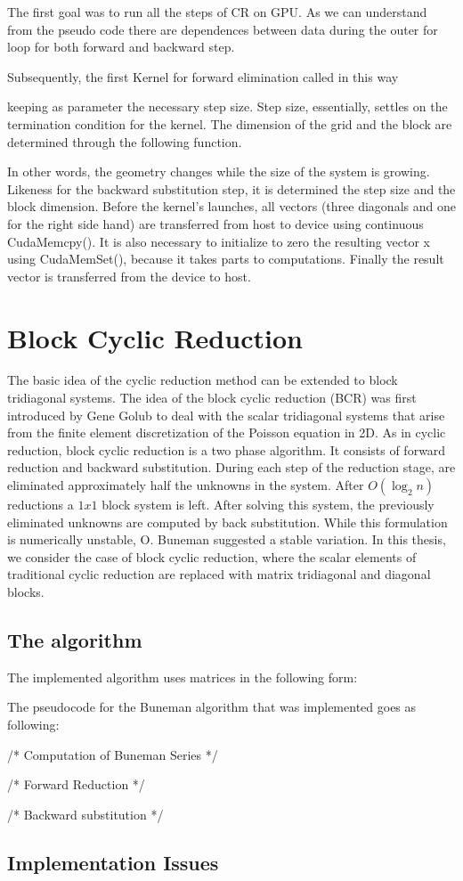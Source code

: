 The first goal was to run all the steps of CR on GPU. As we can understand from the pseudo code there are dependences between data during the outer for loop for both forward and backward step. 

Subsequently, the first Kernel for forward elimination called in this way


keeping as parameter the necessary step size. Step size, essentially, settles on the termination condition for the kernel. The dimension of the grid and the block are determined through the following function.



In other words, the geometry changes while the size of the system is growing. 
Likeness for the backward substitution step, it is determined the step size and the block dimension.
Before the kernel’s launches, all vectors (three diagonals and one for the right side hand) are transferred from host to device using continuous CudaMemcpy(). It is also necessary to initialize to zero the resulting vector x using CudaMemSet(), because it takes parts to computations. Finally the result vector is transferred from the device to host.

\section{Block Cyclic Reduction}


The basic idea of the cyclic reduction method can be extended to block tridiagonal systems. The idea of the block cyclic reduction (BCR) was first introduced by Gene Golub to deal with the scalar tridiagonal systems that arise from the finite element discretization of the Poisson equation in 2D. As in cyclic reduction, block cyclic reduction is a two phase algorithm. It consists of forward reduction and backward substitution. During each step of the reduction stage, are eliminated approximately half the unknowns in the system. After $O(\log_2 n)$ reductions a $1x1$ block system is left. After solving this system, the previously eliminated unknowns are computed by back substitution. While this formulation is numerically unstable, O. Buneman suggested a stable variation.  In this thesis, we consider the case of block cyclic reduction, where the scalar elements of traditional cyclic reduction are replaced with matrix tridiagonal and diagonal blocks.

\subsection{The algorithm}



The implemented algorithm uses matrices in the following form:


The pseudocode for the Buneman algorithm that was implemented goes as following: 



/* Computation of Buneman Series */


/* Forward Reduction */


/* Backward substitution */


\subsection{Implementation Issues}


